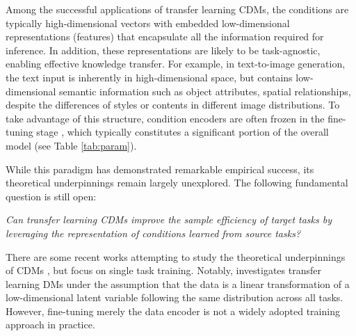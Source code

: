 \documentclass[11pt]{article}
\numberwithin{equation}{section}
\begin{document}
Among the successful applications of transfer learning CDMs, the conditions are typically high-dimensional vectors with embedded low-dimensional representations (features) that encapsulate all the information required for inference. 
In addition, these representations are likely to be task-agnostic, enabling effective knowledge transfer. 
For example, in text-to-image generation, the text input is inherently in high-dimensional space, but contains low-dimensional semantic information such as object attributes, spatial relationships, despite the differences of styles or contents in different image distributions.
To take advantage of this structure, condition encoders are often frozen in the fine-tuning stage \citep{rombach2022high,esser2024scaling}, which typically constitutes a significant portion of the overall model (see Table \ref{tab:param}).
\begin{table}[ht]
    \centering
    \caption{Comparing the number of parameters of different parts in CDMs.}
    \label{tab:param}
\end{table}

While this paradigm has demonstrated remarkable empirical success, its theoretical underpinnings remain largely unexplored.
The following fundamental question is still open:
\begin{center}
    \textit{Can transfer learning CDMs improve the sample efficiency of target tasks by leveraging the representation of conditions learned from source tasks?}
\end{center}
There are some recent works attempting to study the theoretical underpinnings of CDMs \citep{fu2024unveil,jiao2024model,hu2024statistical}, but focus on single task training.
Notably, \citet{yang2024fewshot} investigates transfer learning DMs under the assumption that the data is a linear transformation of a low-dimensional latent variable following the same distribution across all tasks.
However, fine-tuning merely the data encoder is not a widely adopted training approach in practice.
\end{document}
